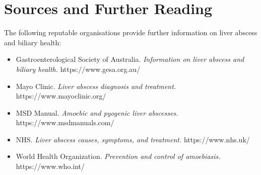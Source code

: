 \section*{Sources and Further Reading}
The following reputable organisations provide further information on liver abscess and biliary health:
\begin{itemize}
    \item Gastroenterological Society of Australia. \textit{Information on liver abscess and biliary health.} https://www.gesa.org.au/
    \item Mayo Clinic. \textit{Liver abscess diagnosis and treatment.} https://www.mayoclinic.org/
    \item MSD Manual. \textit{Amoebic and pyogenic liver abscesses.} https://www.msdmanuals.com/
    \item NHS. \textit{Liver abscess causes, symptoms, and treatment.} https://www.nhs.uk/
    \item World Health Organization. \textit{Prevention and control of amoebiasis.} https://www.who.int/
\end{itemize}
